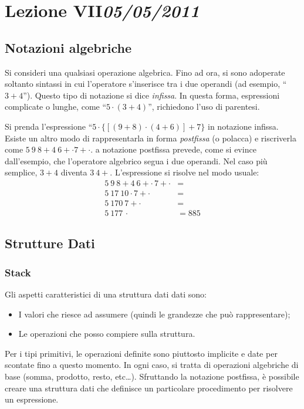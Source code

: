 \chapter[Lezione VII]{Lezione VII\newline\small{\emph{05/05/2011}}}
	\section{Notazioni algebriche}
Si consideri una qualsiasi operazione algebrica. Fino ad ora, si sono adoperate soltanto sintassi in cui l'operatore s'inserisce tra i due operandi (ad esempio, ``$3 + 4$'').
Questo tipo di notazione si dice \emph{infissa}.
In questa forma, espressioni complicate o lunghe, come ``$5\cdot(3+4)$'', richiedono l'uso di parentesi.

Si prenda l'espressione ``$5\cdot\{[(9+8)\cdot(4+6)]+7\}$ in notazione infissa.
Esiste un altro modo di rappresentarla in forma \emph{postfissa} (o polacca) e riscriverla come $5\ 9\ 8 + 4\ 6 + \cdot 7 + \cdot$. 
a notazione postfissa prevede, come si evince dall'esempio, che l'operatore algebrico segua i due operandi.
Nel caso più semplice, $3+4$ diventa $3\ 4 +$. L'espressione si risolve nel modo usuale:
\begin{equation*}
\begin{aligned}
5\ 9\ 8 + 4\ 6 + \cdot\, 7 + \cdot &= \\
5\ 17\ 10 \cdot 7 + \cdot &= \\
5\ 170\ 7 + \cdot &= \\
 5\ 177\, \cdot &= 885
\end{aligned}
\end{equation*}


	\section{Strutture Dati}
		\subsection{Stack}
		\label{subsec:stack}
Gli aspetti caratteristici di una struttura dati dati sono:
\begin{itemize}
	\item
I valori che riesce ad assumere (quindi le grandezze che può rappresentare);
	\item
Le operazioni che posso compiere sulla struttura.

\end{itemize}
Per i tipi primitivi, le operazioni definite sono piuttosto implicite e date per scontate fino a questo momento.
In ogni caso, si tratta di operazioni algebriche di base (somma, prodotto, resto, etc\dots).
Sfruttando la notazione postfissa, è possibile creare una struttura dati che definisce un particolare procedimento per risolvere un espressione.

